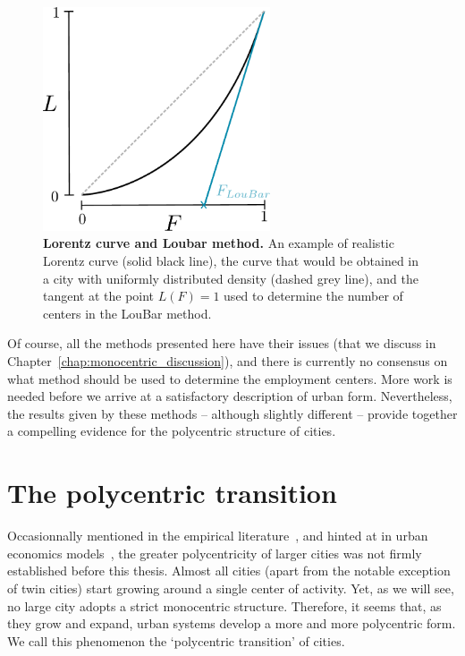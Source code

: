 \begin{figure}
    \centering
    \includegraphics[width=0.6\textwidth]{gfx/chapter-monocentric/loubar.pdf}
    \caption{{\bf Lorentz curve and Loubar method.} An example of realistic Lorentz curve (solid black line), the curve
    that would be obtained in a city with uniformly distributed density (dashed
grey line), and the tangent at the point $L(F) = 1$ used to determine the number
of centers in the LouBar method.\label{fig:loubar}}
\end{figure}

Of course, all the methods presented here have their issues (that we discuss 
in Chapter~\ref{chap:monocentric_discussion}), and there is currently no
consensus on what method should be used to determine the employment centers.
More work is needed before we arrive at a satisfactory description of
urban form. Nevertheless, the results given by these methods -- although slightly
different -- provide together a compelling evidence for the polycentric
structure of cities. 


\section{The polycentric transition}
\label{sec:the_polycentric_transition}

Occasionnally mentioned in the empirical literature~\cite{McMillen:2003,
Redfearn:2007}, and hinted at in urban economics models~\cite{Fujita:1982},
the greater polycentricity of larger cities was not firmly established before
this thesis. Almost all cities (apart from the notable exception of twin cities)
start growing around a single center of activity. Yet, as we will see, no large
city adopts a strict monocentric structure. Therefore, it seems that, as
they grow and expand, urban systems develop a more and more polycentric form. We
call this phenomenon the `polycentric transition' of cities. 

